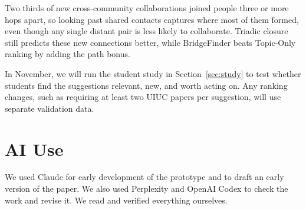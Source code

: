 \documentclass[10pt,twocolumn,letterpaper]{article}
\begin{document}
Two thirds of new cross-community collaborations joined people three or more hops apart, so looking past shared contacts captures where most of them formed, even though any single distant pair is less likely to collaborate. Triadic closure still predicts these new connections better, while BridgeFinder beats Topic-Only ranking by adding the path bonus.

In November, we will run the student study in Section~\ref{sec:study} to test whether students find the suggestions relevant, new, and worth acting on. Any ranking changes, such as requiring at least two UIUC papers per suggestion, will use separate validation data.

\section{AI Use}
We used Claude for early development of the prototype and to draft an early version of the paper. We also used Perplexity and OpenAI Codex to check the work and revise it. We read and verified everything ourselves.
\end{document}
